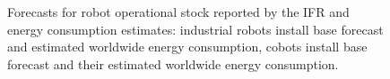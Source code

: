 \begin{figure}[!t]
	\hfill    
	\hspace*{\fill}    
	\caption[] {\label{fig:robot_forecasts} Forecasts for robot operational stock reported by the IFR and energy consumption estimates:  industrial robots install base forecast and  estimated worldwide energy consumption,   cobots install base forecast and their  estimated worldwide energy consumption.}
\end{figure}
